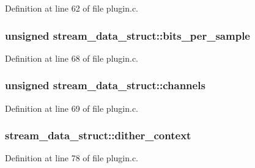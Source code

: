 Definition at line 62 of file plugin.\+c.

\subsubsection[{\texorpdfstring{bits\+\_\+per\+\_\+sample}{bits_per_sample}}]{\setlength{\rightskip}{0pt plus 5cm}unsigned stream\+\_\+data\+\_\+struct\+::bits\+\_\+per\+\_\+sample}\hypertarget{structstream__data__struct_aa4d853bc144d62409081e98bfdbd4c4d}{}\label{structstream__data__struct_aa4d853bc144d62409081e98bfdbd4c4d}


Definition at line 68 of file plugin.\+c.

\subsubsection[{\texorpdfstring{channels}{channels}}]{\setlength{\rightskip}{0pt plus 5cm}unsigned stream\+\_\+data\+\_\+struct\+::channels}\hypertarget{structstream__data__struct_a409d6e47e9e3d835964cf21d6ae76c9c}{}\label{structstream__data__struct_a409d6e47e9e3d835964cf21d6ae76c9c}


Definition at line 69 of file plugin.\+c.

\subsubsection[{\texorpdfstring{dither\+\_\+context}{dither_context}}]{ stream\+\_\+data\+\_\+struct\+::dither\+\_\+context}\hypertarget{structstream__data__struct_a96f14f8d4d3c2fd9749b9a91a47a8f3d}{}\label{structstream__data__struct_a96f14f8d4d3c2fd9749b9a91a47a8f3d}


Definition at line 78 of file plugin.\+c.

